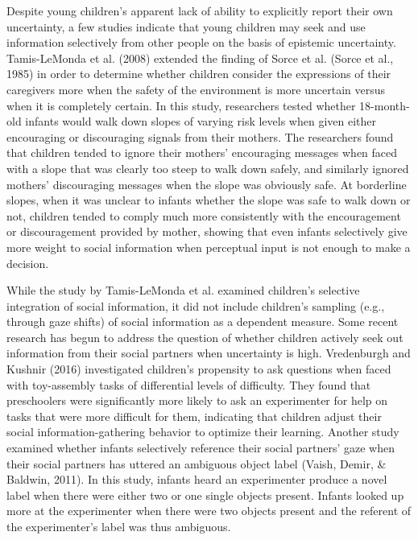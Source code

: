 \documentclass[floatsintext,man]{apa6}
\theoremstyle{definition}
\theoremstyle{definition}
\theoremstyle{definition}
\theoremstyle{remark}
\begin{document}
Despite young children's apparent lack of ability to explicitly report
their own uncertainty, a few studies indicate that young children may
seek and use information selectively from other people on the basis of
epistemic uncertainty. Tamis-LeMonda et al. (2008) extended the finding
of Sorce et al. (Sorce et al., 1985) in order to determine whether
children consider the expressions of their caregivers more when the
safety of the environment is more uncertain versus when it is completely
certain. In this study, researchers tested whether 18-month-old infants
would walk down slopes of varying risk levels when given either
encouraging or discouraging signals from their mothers. The researchers
found that children tended to ignore their mothers' encouraging messages
when faced with a slope that was clearly too steep to walk down safely,
and similarly ignored mothers' discouraging messages when the slope was
obviously safe. At borderline slopes, when it was unclear to infants
whether the slope was safe to walk down or not, children tended to
comply much more consistently with the encouragement or discouragement
provided by mother, showing that even infants selectively give more
weight to social information when perceptual input is not enough to make
a decision.

While the study by Tamis-LeMonda et al. examined children's selective
integration of social information, it did not include children's
sampling (e.g., through gaze shifts) of social information as a
dependent measure. Some recent research has begun to address the
question of whether children actively seek out information from their
social partners when uncertainty is high. Vredenburgh and Kushnir (2016)
investigated children's propensity to ask questions when faced with
toy-assembly tasks of differential levels of difficulty. They found that
preschoolers were significantly more likely to ask an experimenter for
help on tasks that were more difficult for them, indicating that
children adjust their social information-gathering behavior to optimize
their learning. Another study examined whether infants selectively
reference their social partners' gaze when their social partners has
uttered an ambiguous object label (Vaish, Demir, \& Baldwin, 2011). In
this study, infants heard an experimenter produce a novel label when
there were either two or one single objects present. Infants looked up
more at the experimenter when there were two objects present and the
referent of the experimenter's label was thus ambiguous.
\end{document}
